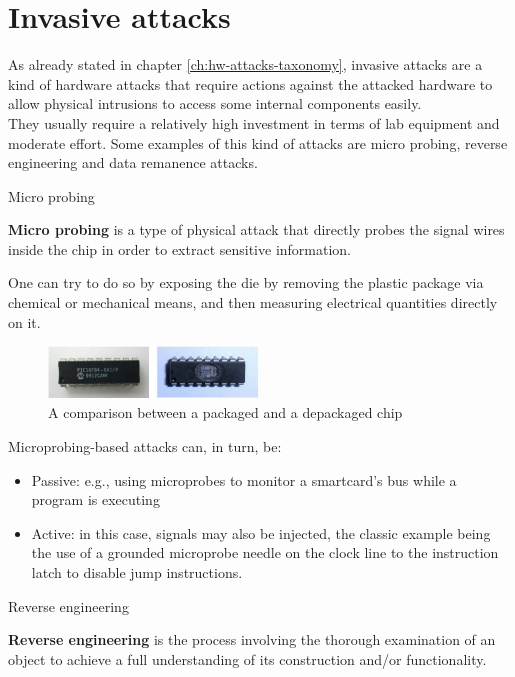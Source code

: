 \chapter{Invasive attacks}
As already stated in chapter \ref{ch:hw-attacks-taxonomy}, invasive attacks are a kind of hardware
attacks that require actions against the attacked hardware to allow physical intrusions to access
some internal components easily.\\
They usually require a relatively high investment in terms of lab equipment and moderate effort.
Some examples of this kind of attacks are micro probing, reverse engineering and data remanence
attacks.
\begin{section}{Micro probing}
  \begin{boxH}
    \textbf{Micro probing} is a type of physical attack that directly probes the signal wires inside
    the chip in order to extract sensitive information.
  \end{boxH}
  One can try to do so by exposing the die by removing the plastic package via chemical or
  mechanical means, and then measuring electrical quantities directly on it.
  \begin{figure}[H]
    \centering
    \includegraphics[width=0.5\textwidth]{img/hardware/depackaged chip.png}
    \caption{A comparison between a packaged and a depackaged chip}
    \label{fig:depackaged-chip}
  \end{figure}
  Microprobing-based attacks can, in turn, be:
  \begin{itemize}
    \item Passive: e.g., using microprobes to monitor a smartcard’s bus while a program is executing
    \item Active: in this case, signals may also be injected, the classic example being the use of a
      grounded microprobe needle on the clock line to the instruction latch to disable jump
      instructions.
  \end{itemize}

\end{section}
\begin{section}{Reverse engineering}
  \begin{boxH}
    \textbf{Reverse engineering} is the process involving the thorough examination of an object to
    achieve a full understanding of its construction and/or functionality.
  \end{boxH}
\end{section}

